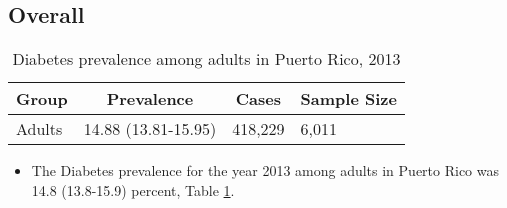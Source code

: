 
\subsection{Overall}




\begin{table}[H]
\caption{Diabetes prevalence among adults in Puerto Rico, 2013\label{tab:Overall.tabl.Diabetes.2013}} 
\begin{center}
\begin{tabular}{llll}
\hline\hline
\multicolumn{1}{l}{Group}&\multicolumn{1}{c}{Prevalence}&\multicolumn{1}{c}{Cases}&\multicolumn{1}{c}{Sample Size}\tabularnewline
\hline
Adults&14.88 (13.81-15.95)&418,229&6,011\tabularnewline
\hline
\end{tabular}\end{center}

\end{table}




\begin{itemize}


\item The Diabetes prevalence for the year 2013 among adults in Puerto Rico was 14.8 (13.8-15.9) percent, 
Table \ref{tab:Overall.tabl.Diabetes.2013}.

\end{itemize}



